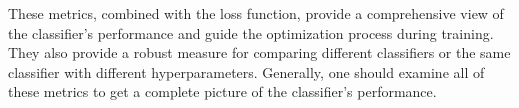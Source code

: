 These metrics, combined with the loss function, provide a comprehensive view of the classifier's performance and guide
the optimization process during training. They also provide a robust measure for comparing different classifiers or the
same classifier with different hyperparameters. Generally, one should examine all of these metrics to get a complete
picture of the classifier's performance.